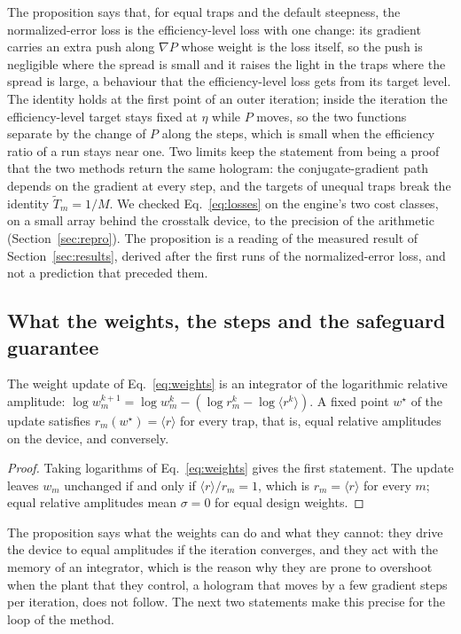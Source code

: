 The proposition says that, for equal traps and the default steepness, the normalized-error loss is the efficiency-level loss with one change: its gradient carries an extra push along $\nabla P$ whose weight is the loss itself, so the push is negligible where the spread is small and it raises the light in the traps where the spread is large, a behaviour that the efficiency-level loss gets from its target level. The identity holds at the first point of an outer iteration; inside the iteration the efficiency-level target stays fixed at $\eta$ while $P$ moves, so the two functions separate by the change of $P$ along the steps, which is small when the efficiency ratio of a run stays near one. Two limits keep the statement from being a proof that the two methods return the same hologram: the conjugate-gradient path depends on the gradient at every step, and the targets of unequal traps break the identity $\tilde T_m=1/M$. We checked Eq.~\ref{eq:losses} on the engine's two cost classes, on a small array behind the crosstalk device, to the precision of the arithmetic (Section~\ref{sec:repro}). The proposition is a reading of the measured result of Section~\ref{sec:results}, derived after the first runs of the normalized-error loss, and not a prediction that preceded them.

\subsection{What the weights, the steps and the safeguard guarantee}

\begin{proposition}\label{prop:weights}
The weight update of Eq.~\ref{eq:weights} is an integrator of the logarithmic relative amplitude: $\log w_m^{k+1}=\log w_m^k-(\log r_m^k-\log\langle r^k\rangle)$. A fixed point $w^\star$ of the update satisfies $r_m(w^\star)=\langle r\rangle$ for every trap, that is, equal relative amplitudes on the device, and conversely.
\end{proposition}
\begin{proof}
Taking logarithms of Eq.~\ref{eq:weights} gives the first statement. The update leaves $w_m$ unchanged if and only if $\langle r\rangle/r_m=1$, which is $r_m=\langle r\rangle$ for every $m$; equal relative amplitudes mean $\sigma=0$ for equal design weights.
\end{proof}

The proposition says what the weights can do and what they cannot: they drive the device to equal amplitudes if the iteration converges, and they act with the memory of an integrator, which is the reason why they are prone to overshoot when the plant that they control, a hologram that moves by a few gradient steps per iteration, does not follow. The next two statements make this precise for the loop of the method.

